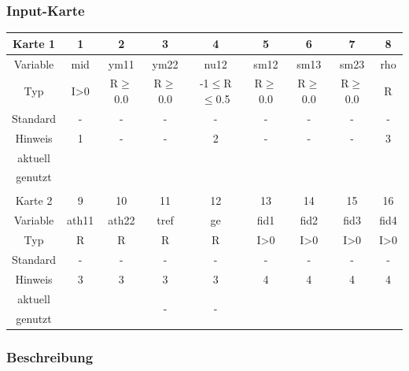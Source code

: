 \documentclass[11pt,titlepage,listof=totoc,bibliography=totoc,twoside]{scrreprt}
\begin{document}
{{\subsubsection{Input-Karte}

\begin{table}[htbp]
\centering
\begin{tabularx}{\textwidth}{cCCCCCCCC}
\toprule
Karte 1	& 1		& 2		& 3		& 4			& 5		& 6		& 7		& 8		\\
\midrule
Variable& mid		& ym11		& ym22		& nu12			& sm12		& sm13		& sm23		& rho		\\
Typ	& I>0		& R$\ge$0.0	& R$\ge$0.0	& -1$\le$R$\le$0.5	& R$\ge$0.0	& R$\ge$0.0	& R$\ge$0.0	& R		\\
Standard& -		& -		& -		& -			& -		& -		& -		& -		\\
Hinweis	& 1		& -		& -		& 2			& -		& -		& -		& 3		\\
aktuell	& 	& 	& 	& 	& 	& 	& 	& 	\\
genutzt \\
\\
Karte 2	& 9		& 10		& 11		& 12			& 13		& 14		& 15		& 16		\\
\midrule
Variable& ath11		& ath22		& tref		& ge			& fid1		& fid2		& fid3		& fid4		\\
Typ	& R		& R		& R		& R			& I>0		& I>0		& I>0		& I>0		\\
Standard& -		& -		& -		& -			& -		& -		& -		& -		\\
Hinweis	& 3		& 3		& 3		& 3			& 4		& 4		& 4		& 4		\\
aktuell	& 	& 	& 	& 	& 	& 	& 	& 	\\
genutzt \\
\bottomrule
\end{tabularx}
\end{table}

\subsubsection{Beschreibung}

}}
\end{document}

